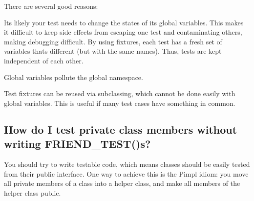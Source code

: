 There are several good reasons\+:
\begin{DoxyEnumerate}
\item It\textquotesingle{}s likely your test needs to change the states of its global variables. This makes it difficult to keep side effects from escaping one test and contaminating others, making debugging difficult. By using fixtures, each test has a fresh set of variables that\textquotesingle{}s different (but with the same names). Thus, tests are kept independent of each other.
\end{DoxyEnumerate}
\begin{DoxyEnumerate}
\item Global variables pollute the global namespace.
\end{DoxyEnumerate}
\begin{DoxyEnumerate}
\item Test fixtures can be reused via subclassing, which cannot be done easily with global variables. This is useful if many test cases have something in common.
\end{DoxyEnumerate}

\subsection*{How do I test private class members without writing F\+R\+I\+E\+N\+D\+\_\+\+T\+E\+S\+T()s?}

You should try to write testable code, which means classes should be easily tested from their public interface. One way to achieve this is the Pimpl idiom\+: you move all private members of a class into a helper class, and make all members of the helper class public.

